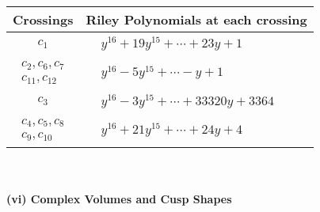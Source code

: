 \documentclass[1p]{elsarticle_modified}
\theoremstyle{definition}
\begin{document}
\begin{tabular}{m{50pt}|m{274pt}}
Crossings & \hspace{64pt}Riley Polynomials at each crossing \\
\hline $$\begin{aligned}c_{1}\end{aligned}$$&$\begin{aligned}
&y^{16}+19 y^{15}+\cdots+23 y+1
\end{aligned}$\\
\hline $$\begin{aligned}c_{2},c_{6},c_{7}\\c_{11},c_{12}\end{aligned}$$&$\begin{aligned}
&y^{16}-5 y^{15}+\cdots- y+1
\end{aligned}$\\
\hline $$\begin{aligned}c_{3}\end{aligned}$$&$\begin{aligned}
&y^{16}-3 y^{15}+\cdots+33320 y+3364
\end{aligned}$\\
\hline $$\begin{aligned}c_{4},c_{5},c_{8}\\c_{9},c_{10}\end{aligned}$$&$\begin{aligned}
&y^{16}+21 y^{15}+\cdots+24 y+4
\end{aligned}$\\
\hline
\end{tabular}\\~\\
\newpage\flushleft \textbf{(vi) Complex Volumes and Cusp Shapes}
\end{document}
